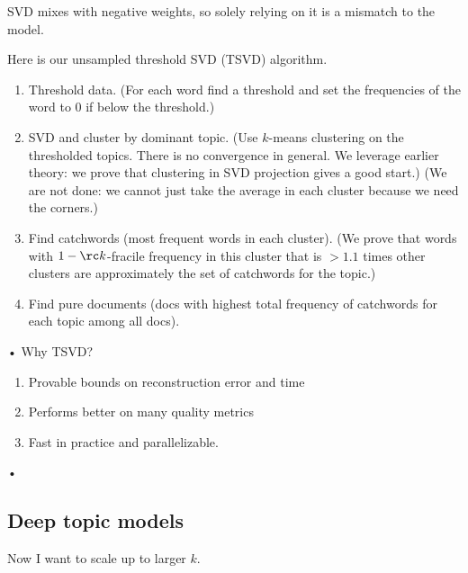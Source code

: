 SVD mixes with negative weights, so solely relying on it is a mismatch to the model.

Here is our unsampled threshold SVD (TSVD) algorithm.
\begin{enumerate}
\item
Threshold data. (For each word find a threshold and set the frequencies of the word to 0 if below the threshold.)
\item
SVD and cluster by dominant topic. (Use $k$-means clustering on the thresholded topics. There is no convergence in general. We leverage earlier theory: we prove that clustering in SVD projection gives a good start.) %
(We are not done: we cannot just take the average in each cluster because we need the corners.)
\item
Find catchwords (most frequent words in each cluster). (We prove that words with $1-\rc k$-fracile frequency in this cluster that is $>1.1$ times other clusters are approximately the set of catchwords for the topic.)
\item
Find pure documents (docs with highest total frequency of catchwords for each topic among all docs). 
\end{enumerate}•
Why TSVD?
\begin{enumerate}
\item
Provable bounds on reconstruction error and time
\item
Performs better on many quality metrics
\item
Fast in practice and parallelizable.
\end{enumerate}•

\subsection{Deep topic models}
%
Now I want to scale up to larger $k$. 

